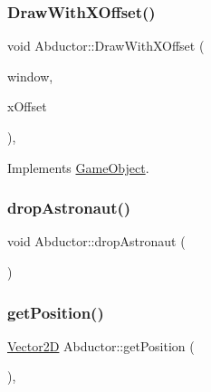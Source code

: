 \hypertarget{class_abductor_a6c68ecc2673674040f87c2409d8505a1}{}\label{class_abductor_a6c68ecc2673674040f87c2409d8505a1} 
\subsubsection{\texorpdfstring{Draw\+With\+X\+Offset()}{DrawWithXOffset()}}
{\footnotesize\ttfamily void Abductor\+::\+Draw\+With\+X\+Offset (\begin{DoxyParamCaption}\item[{sf\+::\+Render\+Window \&}]{window,  }\item[{float}]{x\+Offset }\end{DoxyParamCaption})\hspace{0.3cm}{\ttfamily [override]}, {\ttfamily [virtual]}}



Implements \hyperlink{class_game_object_a8a3c07e92775fe00baa9e661fefb224e}{Game\+Object}.

\hypertarget{class_abductor_a13164f20159447e3e50629283c7cd32d}{}\label{class_abductor_a13164f20159447e3e50629283c7cd32d} 
\subsubsection{\texorpdfstring{drop\+Astronaut()}{dropAstronaut()}}
{\footnotesize\ttfamily void Abductor\+::drop\+Astronaut (\begin{DoxyParamCaption}{ }\end{DoxyParamCaption})}

\hypertarget{class_abductor_a9b01cf2a2870454fe621a7bc5a2828e5}{}\label{class_abductor_a9b01cf2a2870454fe621a7bc5a2828e5} 
\subsubsection{\texorpdfstring{get\+Position()}{getPosition()}}
{\footnotesize\ttfamily \hyperlink{class_vector2_d}{Vector2D} Abductor\+::get\+Position (\begin{DoxyParamCaption}{ }\end{DoxyParamCaption})\hspace{0.3cm}{\ttfamily [override]}, {\ttfamily [virtual]}}



